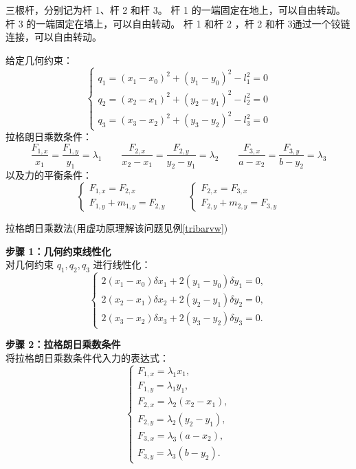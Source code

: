 \documentclass[12pt, a4paper, oneside, UTF8]{ctexbook}  %
\begin{document}
\begin{example}\label{tribar}
三根杆，分别记为杆 1、杆 2 和杆 3。
杆 1 的一端固定在地上，可以自由转动。
杆 3 的一端固定在墙上，可以自由转动。
杆 1 和杆 2 ，杆 2 和杆 3通过一个铰链连接，可以自由转动。

    给定几何约束：
    \[
    \begin{cases}
    q_1 = (x_1 - x_0)^2 + (y_1 - y_0)^2 - l_1^2 = 0 \\
    q_2 = (x_2 - x_1)^2 + (y_2 - y_1)^2 - l_2^2 = 0 \\
    q_3 = (x_3 - x_2)^2 + (y_3 - y_2)^2 - l_3^2 = 0
    \end{cases}
    \]
    拉格朗日乘数条件：
    \[
    \frac{F_{1,x}}{x_1} = \frac{F_{1,y}}{y_1} = \lambda_1 \qquad
    \frac{F_{2,x}}{x_2 - x_1} = \frac{F_{2,y}}{y_2 - y_1} = \lambda_2 \qquad
    \frac{F_{3,x}}{a - x_2} = \frac{F_{3,y}}{b - y_2} = \lambda_3
    \]
    以及力的平衡条件：
    \[
    \begin{cases}
    F_{1,x} = F_{2,x} \\
    F_{1,y} + m_{1,y} = F_{2,y}
    \end{cases}
    \qquad
    \begin{cases}
    F_{2,x} = F_{3,x} \\
    F_{2,y} + m_{2,y} = F_{3,y}
    \end{cases}
    \]
\begin{solution}
    拉格朗日乘数法(用虚功原理解该问题见例\ref{tribarvw})

    \noindent \textbf{步骤 1：几何约束线性化} \\
    对几何约束 \( q_1, q_2, q_3 \) 进行线性化：
    \[
    \begin{cases}
    2(x_1 - x_0) \delta x_1 + 2(y_1 - y_0) \delta y_1 = 0, \\
    2(x_2 - x_1) \delta x_2 + 2(y_2 - y_1) \delta y_2 = 0, \\
    2(x_3 - x_2) \delta x_3 + 2(y_3 - y_2) \delta y_3 = 0.
    \end{cases}
    \]

    \noindent \textbf{步骤 2：拉格朗日乘数条件} \\
    将拉格朗日乘数条件代入力的表达式：
    \[
    \begin{cases}
    F_{1,x} = \lambda_1 x_1, \\
    F_{1,y} = \lambda_1 y_1, \\
    F_{2,x} = \lambda_2 (x_2 - x_1), \\
    F_{2,y} = \lambda_2 (y_2 - y_1), \\
    F_{3,x} = \lambda_3 (a - x_2), \\
    F_{3,y} = \lambda_3 (b - y_2).
    \end{cases}
    \]
    

\end{solution}
\end{example}
\end{document}
